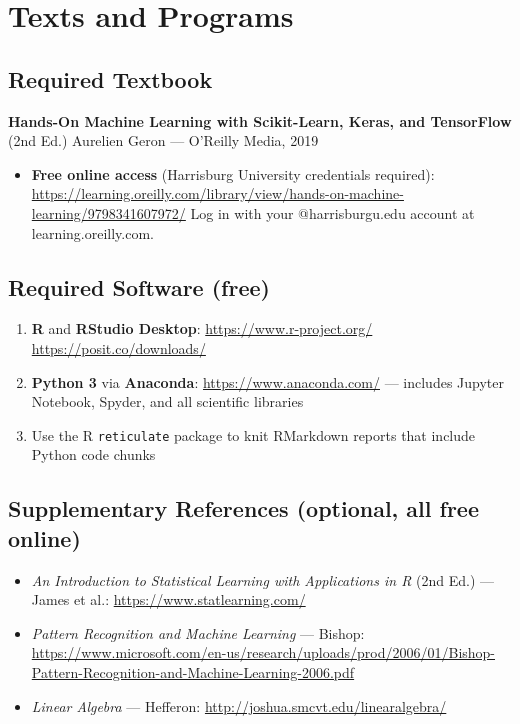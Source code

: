 \documentclass[
  10pt,
]{article}
\providecommand{\tightlist}{%
  \setlength{\itemsep}{0pt}\setlength{\parskip}{0pt}}
\begin{document}
\section*{Texts and Programs}\label{texts-and-programs}

\subsection{Required Textbook}\label{required-textbook}

\textbf{Hands-On Machine Learning with Scikit-Learn, Keras, and
TensorFlow} (2nd Ed.) Aurelien Geron --- O'Reilly Media, 2019

\begin{itemize}
\tightlist
\item
  \textbf{Free online access} (Harrisburg University credentials
  required):
  \url{https://learning.oreilly.com/library/view/hands-on-machine-learning/9798341607972/}
  Log in with your @harrisburgu.edu account at learning.oreilly.com.
\end{itemize}

\subsection{Required Software (free)}\label{required-software-free}

\begin{enumerate}
\def\labelenumi{\arabic{enumi}.}
\tightlist
\item
  \textbf{R} and \textbf{RStudio Desktop}:
  \url{https://www.r-project.org/} \textbar{}
  \url{https://posit.co/downloads/}
\item
  \textbf{Python 3} via \textbf{Anaconda}:
  \url{https://www.anaconda.com/} --- includes Jupyter Notebook, Spyder,
  and all scientific libraries
\item
  Use the R \texttt{reticulate} package to knit RMarkdown reports that
  include Python code chunks
\end{enumerate}

\subsection{Supplementary References (optional, all free
online)}\label{supplementary-references-optional-all-free-online}

\begin{itemize}
\tightlist
\item
  \emph{An Introduction to Statistical Learning with Applications in R}
  (2nd Ed.) --- James et al.: \url{https://www.statlearning.com/}
\item
  \emph{Pattern Recognition and Machine Learning} --- Bishop:
  \url{https://www.microsoft.com/en-us/research/uploads/prod/2006/01/Bishop-Pattern-Recognition-and-Machine-Learning-2006.pdf}
\item
  \emph{Linear Algebra} --- Hefferon:
  \url{http://joshua.smcvt.edu/linearalgebra/}
\end{itemize}
\end{document}
